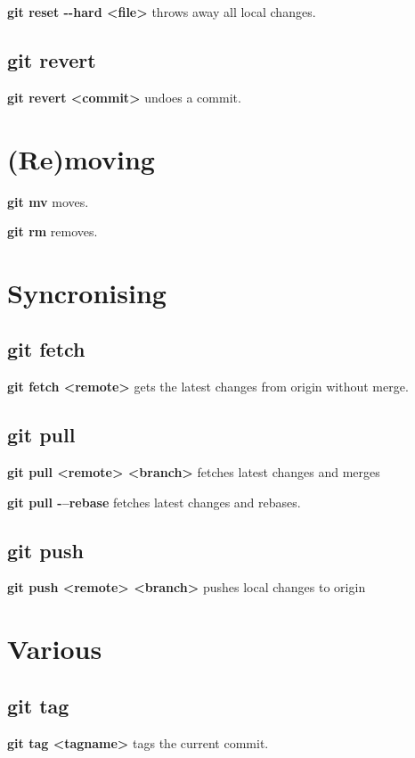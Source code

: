 \documentclass{programmingnotes}
\begin{document}
\begin{multicols*}{3}
\textbf{git reset -{}-hard <file>} throws away all local changes.

\subsection*{\dotfill git revert}
\textbf{git revert <commit>} undoes a commit.

\section*{(Re)moving} 
\textbf{git mv} moves.

\textbf{git rm} removes.

\section*{Syncronising} 

\subsection*{\dotfill git fetch}
\textbf{git fetch <remote>} gets the latest changes from origin without merge.

\subsection*{\dotfill git pull}
\textbf{git pull <remote> <branch>} fetches latest changes and merges

\textbf{git pull -{}--rebase} fetches latest changes and rebases.

\subsection*{\dotfill git push}
\textbf{git push <remote> <branch>} pushes local changes to origin

\section*{Various}
\subsection*{\dotfill git tag}
\textbf{git tag <tagname>} tags the current commit.
\end{multicols*}
\end{document}
